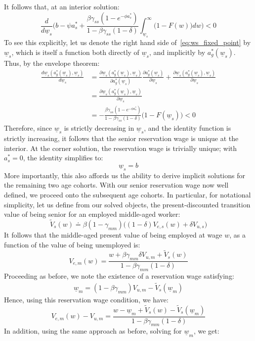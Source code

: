 \documentclass{article}
\newcommand{\lbar}[1]{\underline{#1}} %
\begin{document}
\noindent It follows that, at an interior solution:
\[
\frac{d}{d\lbar{w}_s}\biggl(b-\psi a_s^*+\frac{\beta\gamma_{ss}(1-e^{-\phi a_s^*})}{1-\beta\gamma_{ss}(1-\delta)}\int_{\lbar{w}_s}^{\infty} \bigl(1-F(w)\bigr)dw\biggr)<0
\]
To see this explicitly, let us denote the right hand side of~\eqref{eq:ws_fixed_point} by $\lbar{w}_s$, which is itself a function both directly of $\lbar{w}_s$, and implicitly by $a^*_g(\lbar{w}_s)$. Thus, by the envelope theorem:
\begin{align*}
\frac{d\lbar{w}_s(a^*_g(\lbar{w}_s), \lbar{w}_s)}{d\lbar{w}_s}&=\frac{\partial \lbar{w}_s(a^*_g(\lbar{w}_s), \lbar{w}_s)}{\partial a^*_g(\lbar{w}_s)}\frac{\partial a^*_g(\lbar{w}_s)}{\partial \lbar{w}_s}+\frac{\partial \lbar{w}_s(a^*_g(\lbar{w}_s), \lbar{w}_s)}{\partial \lbar{w}_s}\\
&=\frac{\partial \lbar{w}_s(a^*_g(\lbar{w}_s), \lbar{w}_s)}{\partial \lbar{w}_s}\\
&=-\frac{\beta\gamma_{ss}(1-e^{-\phi a_s^*})}{1-\beta\gamma_{ss}(1-\delta)}\bigl(1-F(\lbar{w}_s)\bigr)<0
\end{align*}
Therefore, since $\lbar{w}_s$ is strictly decreasing in $\lbar{w}_s$, and the identity function is strictly increasing, it follows that the senior reservation wage is unique at the interior. At the corner solution, the reservation wage is trivially unique; with $a^*_s=0$, the identity simplifies to:
\[
\lbar{w}_s=b
\]
More importantly, this also affords us the ability to derive implicit solutions for the remaining two age cohorts. With our senior reservation wage now well defined, we proceed onto the subsequent age cohorts. In particular, for notational simplicity, let us define from our solved objects, the present-discounted transition value of being senior for an employed middle-aged worker:
\[
\tilde{V}_s(w)\doteq \beta(1-\gamma_{mm})\bigl((1-\delta)V_{e,s}(w)+\delta V_{u,s}\bigr)
\]
It follows that the middle-aged present value of being employed at wage $w$, as a function of the value of being unemployed is:
\[
V_{e,m}(w)=\frac{w+\beta\gamma_{mm}\delta V_{u,m}+\tilde{V}_s(w)}{1-\beta\gamma_{mm}(1-\delta)}
\]
Proceeding as before, we note the existence of a reservation wage satisfying:
\begin{align*}
\lbar{w}_m=(1-\beta\gamma_{mm})V_{u,m}-\tilde{V}_s(\lbar{w}_m)
\end{align*}
Hence, using this reservation wage condition, we have:
\[
V_{e,m}(w)-V_{u,m}=
\frac{
w-\lbar{w}_m+\tilde V_s(w)-\tilde V_s(\lbar{w}_m)
}
{1-\beta\gamma_{mm}(1-\delta)}
\]
In addition, using the same approach as before, solving for $\lbar{w}_m$, we get:
\end{document}
